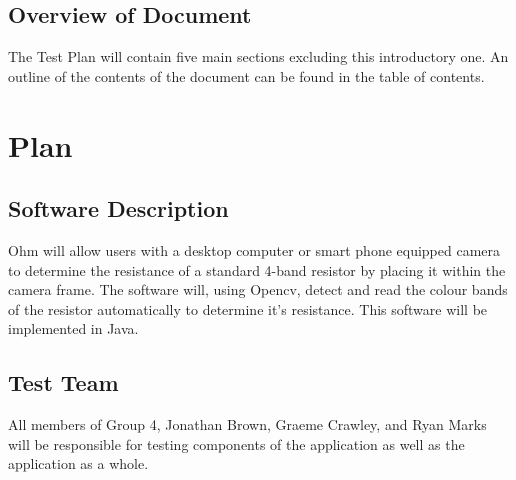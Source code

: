 \documentclass[12pt, titlepage]{article}
\begin{document}

\subsection{Overview of Document}
The Test Plan will contain five main sections excluding this introductory one. An outline of the contents of the document can be found in the table of contents.

\section{Plan}
	
\subsection{Software Description}
Ohm will allow users with a desktop computer or smart phone equipped camera to determine the resistance of a standard 4-band resistor by placing it within the camera frame. The software will, using Opencv, detect and read the colour bands of the resistor automatically to determine it's resistance. This software will be implemented in Java.
\subsection{Test Team}
All members of Group 4, Jonathan Brown, Graeme Crawley, and Ryan Marks will be responsible for testing components of the application as well as the application as a whole.
\end{document}
